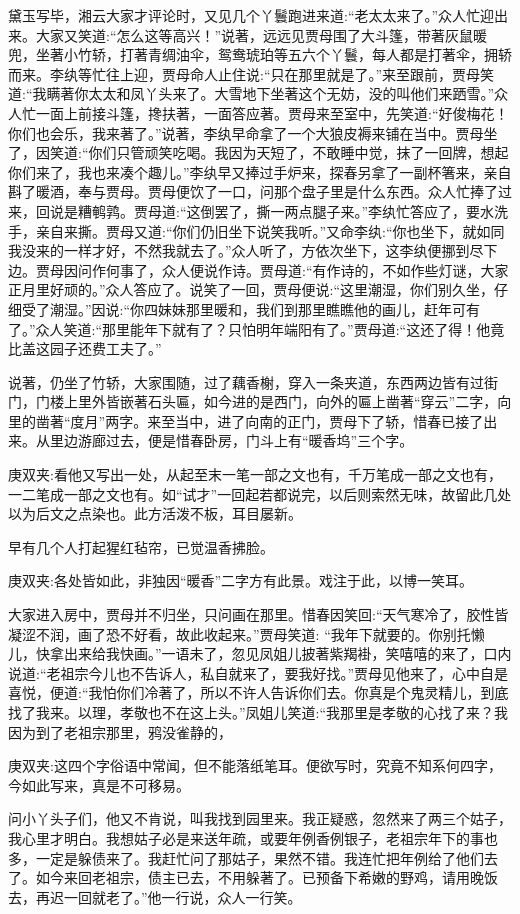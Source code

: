 \begin{parag}
    黛玉写毕，湘云大家才评论时，又见几个丫鬟跑进来道:“老太太来了。”众人忙迎出来。大家又笑道:“怎么这等高兴！”说著，远远见贾母围了大斗篷，带著灰鼠暖兜，坐著小竹轿，打著青绸油伞，鸳鸯琥珀等五六个丫鬟，每人都是打著伞，拥轿而来。李纨等忙往上迎，贾母命人止住说:“只在那里就是了。”来至跟前，贾母笑道:“我瞒著你太太和凤丫头来了。大雪地下坐著这个无妨，没的叫他们来跴雪。”众人忙一面上前接斗篷，搀扶著，一面答应著。贾母来至室中，先笑道:“好俊梅花！你们也会乐，我来著了。”说著，李纨早命拿了一个大狼皮褥来铺在当中。贾母坐了，因笑道:“你们只管顽笑吃喝。我因为天短了，不敢睡中觉，抹了一回牌，想起你们来了，我也来凑个趣儿。”李纨早又捧过手炉来，探春另拿了一副杯箸来，亲自斟了暖酒，奉与贾母。贾母便饮了一口，问那个盘子里是什么东西。众人忙捧了过来，回说是糟鹌鹑。贾母道:“这倒罢了，撕一两点腿子来。”李纨忙答应了，要水洗手，亲自来撕。贾母又道:“你们仍旧坐下说笑我听。”又命李纨:“你也坐下，就如同我没来的一样才好，不然我就去了。”众人听了，方依次坐下，这李纨便挪到尽下边。贾母因问作何事了，众人便说作诗。贾母道:“有作诗的，不如作些灯谜，大家正月里好顽的。”众人答应了。说笑了一回，贾母便说:“这里潮湿，你们别久坐，仔细受了潮湿。”因说:“你四妹妹那里暖和，我们到那里瞧瞧他的画儿，赶年可有了。”众人笑道:“那里能年下就有了？只怕明年端阳有了。”贾母道:“这还了得！他竟比盖这园子还费工夫了。”
\end{parag}


\begin{parag}
    说著，仍坐了竹轿，大家围随，过了藕香榭，穿入一条夹道，东西两边皆有过街门，门楼上里外皆嵌著石头匾，如今进的是西门，向外的匾上凿著“穿云”二字，向里的凿著“度月”两字。来至当中，进了向南的正门，贾母下了轿，惜春已接了出来。从里边游廊过去，便是惜春卧房，门斗上有“暖香坞”三个字。\begin{note}庚双夹:看他又写出一处，从起至末一笔一部之文也有，千万笔成一部之文也有，一二笔成一部之文也有。如“试才”一回起若都说完，以后则索然无味，故留此几处以为后文之点染也。此方活泼不板，耳目屡新。\end{note}早有几个人打起猩红毡帘，已觉温香拂脸。\begin{note}庚双夹:各处皆如此，非独因“暖香”二字方有此景。戏注于此，以博一笑耳。\end{note}大家进入房中，贾母并不归坐，只问画在那里。惜春因笑回:“天气寒冷了，胶性皆凝涩不润，画了恐不好看，故此收起来。”贾母笑道: “我年下就要的。你别托懒儿，快拿出来给我快画。”一语未了，忽见凤姐儿披著紫羯褂，笑嘻嘻的来了，口内说道:“老祖宗今儿也不告诉人，私自就来了，要我好找。”贾母见他来了，心中自是喜悦，便道:“我怕你们冷著了，所以不许人告诉你们去。你真是个鬼灵精儿，到底找了我来。以理，孝敬也不在这上头。”凤姐儿笑道:“我那里是孝敬的心找了来？我因为到了老祖宗那里，鸦没雀静的，\begin{note}庚双夹:这四个字俗语中常闻，但不能落纸笔耳。便欲写时，究竟不知系何四字，今如此写来，真是不可移易。\end{note}问小丫头子们，他又不肯说，叫我找到园里来。我正疑惑，忽然来了两三个姑子，我心里才明白。我想姑子必是来送年疏，或要年例香例银子，老祖宗年下的事也多，一定是躲债来了。我赶忙问了那姑子，果然不错。我连忙把年例给了他们去了。如今来回老祖宗，债主已去，不用躲著了。已预备下希嫩的野鸡，请用晚饭去，再迟一回就老了。”他一行说，众人一行笑。
\end{parag}


